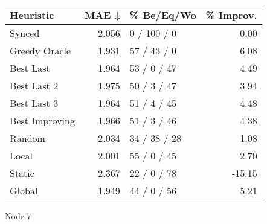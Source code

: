 \begin{tabular}{lrlr}
\toprule
\textbf{Heuristic} & \textbf{MAE ↓} & \textbf{\% Be/Eq/Wo} & \textbf{\% Improv.} \\
\midrule
            Synced &          2.056 &          0 / 100 / 0 &                0.00 \\
     Greedy Oracle &          1.931 &          57 / 43 / 0 &                6.08 \\
         Best Last &          1.964 &          53 / 0 / 47 &                4.49 \\
       Best Last 2 &          1.975 &          50 / 3 / 47 &                3.94 \\
       Best Last 3 &          1.964 &          51 / 4 / 45 &                4.48 \\
    Best Improving &          1.966 &          51 / 3 / 46 &                4.38 \\
            Random &          2.034 &         34 / 38 / 28 &                1.08 \\
             Local &          2.001 &          55 / 0 / 45 &                2.70 \\
            Static &          2.367 &          22 / 0 / 78 &              -15.15 \\
            Global &          1.949 &          44 / 0 / 56 &                5.21 \\
\bottomrule
\end{tabular}
\caption{Node 7}
\label{tab:ds_non_lr01_le2_bs2_7}
